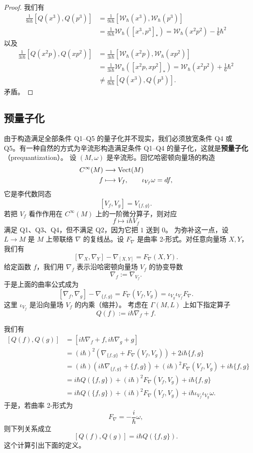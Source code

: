 \begin{proof}
  我们有
  \[
  \begin{aligned}
  \frac{1}{9i\hbar}[Q(x^3),Q(p^3)]
  &=\frac{1}{9i\hbar}[\mathcal{W}_\hbar(x^3),\mathcal{W}_\hbar(p^3)]\\
  &=\frac{1}{9i\hbar}\mathcal{W}_\hbar([x^3,p^3]_*)
  =\mathcal{W}_\hbar(x^2p^2)-\frac16\hbar^2
  \end{aligned}
  \]
  以及
  \[
  \begin{aligned}
  \frac{1}{3i\hbar}[Q(x^2p),Q(xp^2)]
  &=\frac{1}{3i\hbar}[\mathcal{W}_\hbar(x^2p),\mathcal{W}_\hbar(xp^2)]\\
  &=\frac{1}{3i\hbar}\mathcal{W}_\hbar([x^2p,xp^2]_*)
  =\mathcal{W}_\hbar(x^2p^2)+\frac16\hbar^2\\
  &\ne\frac{1}{9i\hbar}[Q(x^3),Q(p^3)].
  \end{aligned}
  \]
  矛盾。
\end{proof}

\subsection{预量子化}

由于构造满足全部条件 Q1–Q5 的量子化并不现实，我们必须放宽条件 Q4 或 Q5。有一种自然的方式为辛流形构造满足条件 Q1–Q4 的量子化，这就是\textbf{预量子化}（prequantization）。
设 $(M,\omega)$ 是辛流形。回忆哈密顿向量场的构造
\[
\begin{aligned}
C^\infty(M)&\longrightarrow\mathrm{Vect}(M)\\
f&\longmapsto V_f,\qquad \iota_{V_f}\omega=d f,
\end{aligned}
\]
它是李代数同态
\[
[V_f,V_g]=V_{\{f,g\}}.
\]
若把 $V_f$ 看作作用在 $C^\infty(M)$ 上的一阶微分算子，则对应
\[
f\longmapsto i\hbar V_f
\]
满足 Q1、Q3、Q4，但不满足 Q2，因为它把 $1$ 送到 $0$。
为弥补这一点，设 $L\to M$ 是 $M$ 上带联络 $\nabla$ 的复线丛。设 $F_\nabla$ 是曲率 2-形式。对任意向量场 $X,Y$，我们有
\[
[\nabla_X,\nabla_Y]-\nabla_{[X,Y]}=F_\nabla(X,Y).
\]
给定函数 $f$，我们用 $\nabla_f$ 表示沿哈密顿向量场 $V_f$ 的协变导数
\[
\nabla_f:=\nabla_{V_f}.
\]
于是上面的曲率公式成为
\[
[\nabla_f,\nabla_g]-\nabla_{\{f,g\}}
=F_\nabla(V_f,V_g)=\iota_{V_g}\iota_{V_f}F_\nabla.
\]
这里 $\iota_{V_f}$ 是沿向量场 $V_f$ 的内乘（缩并）。
考虑在 $\Gamma(M,L)$ 上如下指定算子
\[
Q(f):=i\hbar\nabla_f+f.
\]

我们有
\[
\begin{aligned}
[Q(f),Q(g)]
&=[i\hbar\nabla_f+f,i\hbar\nabla_g+g]\\
&=(i\hbar)^2\left(\nabla_{\{f,g\}}+F_\nabla(V_f,V_g)\right)
+2i\hbar\{f,g\}\\
&=(i\hbar)\left(i\hbar\nabla_{\{f,g\}}+\{f,g\}\right)
+(i\hbar)^2F_\nabla(V_f,V_g)+i\hbar\{f,g\}\\
&=i\hbar Q(\{f,g\})+(i\hbar)^2F_\nabla(V_f,V_g)+i\hbar\{f,g\}\\
&=i\hbar Q(\{f,g\})+(i\hbar)^2F_\nabla(V_f,V_g)
+i\hbar\iota_{V_f}\iota_{V_g}\omega.
\end{aligned}
\]
于是，若曲率 2-形式为
\[
F_\nabla=-\frac{i}{\hbar}\omega,
\]
则下列关系成立
\[
[Q(f),Q(g)]=i\hbar Q(\{f,g\}).
\]
这个计算引出下面的定义。

